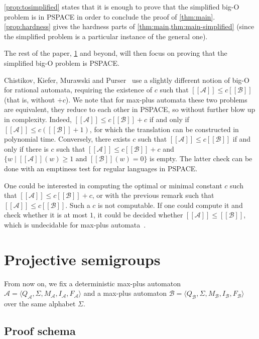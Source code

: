 \documentclass{lmcs}
\theoremstyle{remark}
\newcommand{\autA}{\mathcal{A}}
\newcommand{\autB}{\mathcal{B}}
\newcommand{\brfunc}[1]{[\![#1]\!]}
\newcommand{\funcA}{\brfunc{\autA}}
\newcommand{\funcB}{\brfunc{\autB}}
\theoremstyle{remark}
\begin{document}
\cref{prop:tosimplified} states that it is enough to prove that the simplified big-O problem is in PSPACE in order to conclude the proof of \cref{thm:main}. \cref{prop:hardness} gives the hardness parts of \cref{thm:main,thm:main-simplified} (since the simplified problem is a particular instance of the general one).
 
The rest of the paper, \cref{section:projection} and beyond, will then focus on proving that the simplified big-O problem is PSPACE.

\begin{rem}\label{remark:bigowithoutplusc}
Chistikov, Kiefer, Murawski and Purser~\cite{ChistikovKMP22} use a slightly different notion of big-O for rational automata, requiring the existence of $c$ such that $\funcA \le c \funcB$ (that is, without $+c$). We note that for max-plus automata these two problems are equivalent, they reduce to each other in PSPACE, so without further blow up in complexity.
Indeed, $\funcA \le c\funcB+c$ if and only if $\funcA \le c(\funcB+1)$, for which the translation can be constructed in polynomial time.
Conversely, there exists $c$ such that $\funcA \le c\funcB$ if and only if there is $c$ such that $\funcA \le c\funcB+ c$ and $\{w \mid \funcA(w) \ge 1 \text{ and } \funcB(w) = 0\}$ is empty. The latter check can be done with an emptiness test for regular languages in PSPACE.
\end{rem}
\begin{rem}
One could be interested in computing the optimal or minimal constant $c$ such that $\funcA \le c\funcB + c$, or with the previous remark such that  $\funcA \le c\funcB$. Such a $c$ is not computable. If one could compute it and check whether it is at most $1$, it could be decided whether $\funcA \le \funcB$, which is undecidable for max-plus automata~\cite{Krob94}.
\end{rem}

\section{Projective semigroups}
\label{section:projection}

From now on, we fix a deterministic max-plus automaton $\autA = \langle Q_\autA, \Sigma, M_\autA, I_\autA, F_\autA\rangle$ and a max-plus automaton $\autB = \langle Q_\autB, \Sigma, M_\autB, I_\autB, F_\autB\rangle$ over the same alphabet $\Sigma$.

\subsection{Proof schema}
\end{document}
